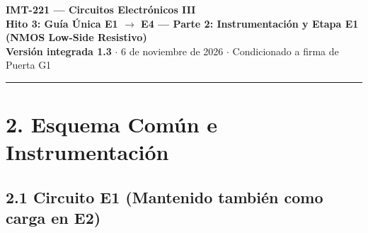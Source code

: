 \documentclass[10pt, a4paper, landscape]{article}
\begin{document}
\noindent
{\LARGE \textbf{\textcolor{ucbblue}{IMT-221 — Circuitos Electrónicos III}}}\\[0.12cm]
{\Large \textbf{Hito 3: Guía Única E1 $\rightarrow$ E4 — Parte 2: Instrumentación y Etapa E1 (NMOS Low-Side Resistivo)}}\\[0.08cm]
{\small \textbf{Versión integrada 1.3} $\cdot$ 6 de noviembre de 2026 $\cdot$ Condicionado a firma de Puerta G1}
\par\vspace{0.15cm}\noindent\rule{\linewidth}{0.4pt}\vspace{0.2cm}

\section*{2. Esquema Común e Instrumentación}

\subsection*{2.1 Circuito E1 (Mantenido también como carga en E2)}
\end{document}
